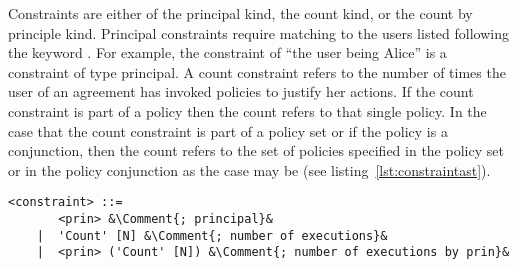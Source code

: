 Constraints are either of the principal kind, the count kind, or the count by principle kind. Principal constraints require matching to the users listed following the keyword . For example, the constraint of ``the user being Alice'' is a constraint of type principal. A count constraint refers to the number of times the user of an agreement has invoked policies to justify her actions. If the count constraint is part of a policy then the count refers to that single policy. In the case that the count constraint is part of a policy set or if the policy is a conjunction, then the count refers to the set of policies specified in the policy set or in the policy conjunction as the case may be (see listing~\ref{lst:constraintast}).

\lstset{mathescape, language=AST, escapechar=\&}  
\begin{minipage}[c]{0.95\textwidth}
\begin{lstlisting}[frame=single, caption={constraint},label={lst:constraintast}]
<constraint> ::=  
       <prin> &\Comment{; principal}&
    |  'Count' [N] &\Comment{; number of executions}&
    |  <prin> ('Count' [N]) &\Comment{; number of executions by prin}&
\end{lstlisting}
\end{minipage}